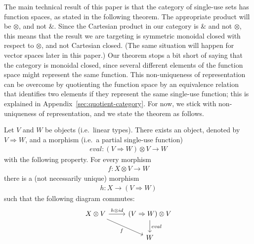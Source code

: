 \documentclass[10pt,a4paper]{amsart}
\numberwithin{equation}{section}
\theoremstyle{plain}
\newcommand{\funspace}[2]{#1 \Rightarrow #2}
\begin{document}
 
The main technical result of this paper is that the category of single-use sets has function spaces, as stated in the following theorem.  The appropriate product will be $\otimes$, and not $\&$. Since the Cartesian product in our category is $\&$ and not $\otimes$, this means that the result we are targeting is symmetric monoidal closed with respect to $\otimes$, and not Cartesian closed. (The same situation will happen  for vector spaces later in this paper.)  Our theorem stops a bit short of saying that the category is monoidal closed, since several different elements of the function space might represent the same function. This non-uniqueness of representation can be overcome  by quotienting the function space  by an equivalence relation that identifies two elements if they represent the same single-use function; this is explained in Appendix~\ref{sec:quotient-category}. For now, we stick with non-uniqueness of representation, and we state the theorem as follows.

\begin{theorem}\label{thm:single-use-closed}
    Let $V$ and $W$ be objects (i.e.~linear types). There exists an object, denoted by  $\funspace V W$, and a morphism (i.e.~a partial single-use function)
    \begin{align*}
    eval : (\funspace V W) \otimes V \to  W
    \end{align*}
    with the following property. For every morphism
    \begin{align*}
    f : {X \otimes V} \to  W
    \end{align*}
    there is a (not necessarily unique) morphism
    \begin{align*}
    h :  X \to (\funspace V W)
    \end{align*}
    such that the following diagram commutes:
    \[
    \begin{tikzcd}
    X \otimes V 
    \arrow[r,"h \otimes id"]
    \arrow[dr,"f"']
    &
    (\funspace V W) \otimes V
    \arrow[d,"eval"] \\
    &
    W
    \end{tikzcd}
    \]
\end{theorem}
\end{document}
